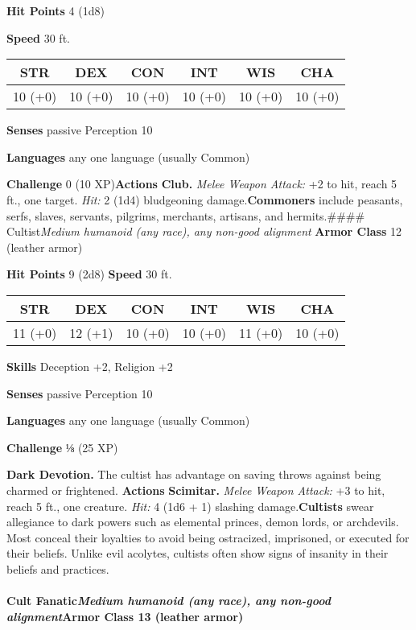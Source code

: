 \documentclass[
]{article}
\begin{document}
\textbf{Hit Points} 4 (1d8)

\textbf{Speed} 30 ft.

\begin{longtable}[]{@{}cccccc@{}}
\toprule
STR & DEX & CON & INT & WIS & CHA\tabularnewline
\midrule
\endhead
10 (+0) & 10 (+0) & 10 (+0) & 10 (+0) & 10 (+0) & 10 (+0)\tabularnewline
\bottomrule
\end{longtable}

\textbf{Senses} passive Perception 10

\textbf{Languages} any one language (usually Common)

\textbf{Challenge} 0 (10 XP)\textbf{Actions} \textbf{Club.} \emph{Melee
Weapon Attack:} +2 to hit, reach 5 ft., one target. \emph{Hit:} 2 (1d4)
bludgeoning damage.\textbf{Commoners} include peasants, serfs, slaves,
servants, pilgrims, merchants, artisans, and hermits.\#\#\#\#
Cultist\emph{Medium humanoid (any race), any non-good alignment}
\textbf{Armor Class} 12 (leather armor)

\textbf{Hit Points} 9 (2d8) \textbf{Speed} 30 ft.

\begin{longtable}[]{@{}cccccc@{}}
\toprule
STR & DEX & CON & INT & WIS & CHA\tabularnewline
\midrule
\endhead
11 (+0) & 12 (+1) & 10 (+0) & 10 (+0) & 11 (+0) & 10 (+0)\tabularnewline
\bottomrule
\end{longtable}

\textbf{Skills} Deception +2, Religion +2

\textbf{Senses} passive Perception 10

\textbf{Languages} any one language (usually Common)

\textbf{Challenge} ⅛ (25 XP)

\textbf{Dark Devotion.} The cultist has advantage on saving throws
against being charmed or frightened. \textbf{Actions} \textbf{Scimitar.}
\emph{Melee Weapon Attack:} +3 to hit, reach 5 ft., one creature.
\emph{Hit:} 4 (1d6 + 1) slashing damage.\textbf{Cultists} swear
allegiance to dark powers such as elemental princes, demon lords, or
archdevils. Most conceal their loyalties to avoid being ostracized,
imprisoned, or executed for their beliefs. Unlike evil acolytes,
cultists often show signs of insanity in their beliefs and practices.

\hypertarget{cult-fanaticmedium-humanoid-any-race-any-non-good-alignmentarmor-class-13-leather-armor}{%
\paragraph{\texorpdfstring{Cult Fanatic\emph{Medium humanoid (any race),
any non-good alignment}\textbf{Armor Class} 13 (leather
armor)}{Cult FanaticMedium humanoid (any race), any non-good alignmentArmor Class 13 (leather armor)}}\label{cult-fanaticmedium-humanoid-any-race-any-non-good-alignmentarmor-class-13-leather-armor}}
\end{document}
